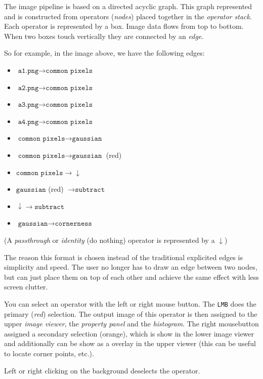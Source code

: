 \documentclass{article}
\begin{document}
The image pipeline is based on a directed acyclic graph. This graph represented
and is constructed from operators (\emph{nodes}) placed together in the \emph{operator
stack}. Each operator is represented by a box. Image data flows from top to
bottom. When two boxes touch vertically they are connected by an \emph{edge}.

So for example, in the image above, we have the following edges:
\begin{itemize}
\item $\texttt{a1.png} \rightarrow \texttt{common pixels}$
\item $\texttt{a2.png} \rightarrow \texttt{common pixels}$
\item $\texttt{a3.png} \rightarrow \texttt{common pixels}$
\item $\texttt{a4.png} \rightarrow \texttt{common pixels}$
\item $\texttt{common pixels} \rightarrow \texttt{gaussian}$
\item $\texttt{common pixels} \rightarrow \texttt{gaussian}$ (red)
\item $\texttt{common pixels} \rightarrow \texttt{$\downarrow$}$
\item $\texttt{gaussian}$ (red) $\rightarrow \texttt{subtract}$
\item $\texttt{$\downarrow$} \rightarrow \texttt{subtract}$
\item $\texttt{gaussian} \rightarrow \texttt{cornerness}$
\end{itemize}

(A \emph{passthrough} or \emph{identity} (do nothing) operator is represented by
a \texttt{$\downarrow$})

The reason this format is chosen instead of the traditional explicited edges is
simplicity and speed. The user no longer has to draw an edge between two nodes,
but can just place them on top of each other and achieve the same effect with
less screen clutter.

You can select an operator with the left or right mouse button. The \texttt{LMB}
does the primary (\emph{red}) selection. The output image of this operator is
then assigned to the upper \emph{image viewer}, the \emph{property panel} and
the \emph{histogram}.  The right mousebutton assigned a secondary selection
(orange), which is show in the lower image viewer and additionally can be show
as a overlay in the upper viewer (this can be useful to locate corner points, etc.).

Left or right clicking on the background deselects the operator.
\end{document}
